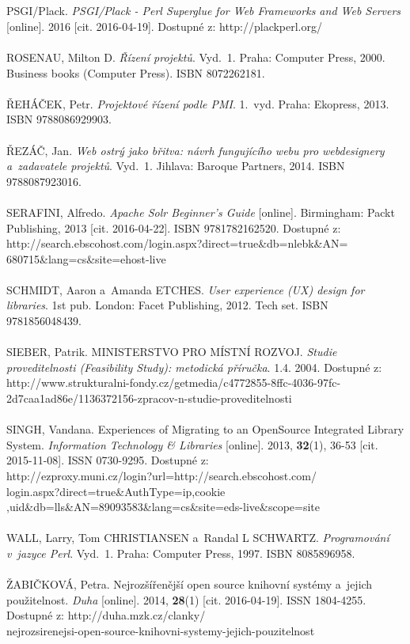 \documentclass[
	11pt, oneside, printed, final, palatino
	microtype,
	table,   %
	lof,     %
	lot     %
]{fithesis3}
\begin{document}
{~\\ ~\\ \noindent
[27] PSGI/Plack. \textit{PSGI/Plack - Perl Superglue for Web Frameworks and Web Servers} [online]. 2016 [cit. 2016-04-19]. Dostupné z: http://plackperl.org/
~\\ ~\\ \noindent
[28] ROSENAU, Milton D. \textit{Řízení projektů}. Vyd.~1. Praha: Computer Press, 2000. Business books (Computer Press). ISBN 8072262181.
~\\ ~\\ \noindent
[29] ŘEHÁČEK, Petr. \textit{Projektové řízení podle PMI}. 1.~vyd. Praha: Ekopress, 2013. ISBN 9788086929903.
~\\ ~\\ \noindent
[30] ŘEZÁČ, Jan. \textit{Web ostrý jako břitva: návrh fungujícího webu pro webdesignery a~zadavatele projektů}. Vyd.~1. Jihlava: Baroque Partners, 2014. ISBN 9788087923016.
~\\ ~\\ \noindent
[31] SERAFINI, Alfredo. \textit{Apache Solr Beginner’s Guide} [online]. Birmingham: Packt Publishing, 2013 [cit. 2016-04-22]. ISBN 9781782162520. Dostupné z: http://search.ebscohost.com/login.aspx?direct=true\&db=nlebk\&AN=\\680715\&lang=cs\&site=ehost-live
~\\ ~\\ \noindent
[32] SCHMIDT, Aaron a~Amanda ETCHES. \textit{User experience (UX) design for libraries}. 1st pub. London: Facet Publishing, 2012. Tech set. ISBN 9781856048439.
~\\ ~\\ \noindent
[33] SIEBER, Patrik. MINISTERSTVO PRO MÍSTNÍ ROZVOJ. \textit{Studie proveditelnosti (Feasibility Study): metodická příručka}. 1.4. 2004. Dostupné z: \\http://www.strukturalni-fondy.cz/getmedia/c4772855-8ffc-4036-97fc-\\2d7caa1ad86e/1136372156-zpracov-n-studie-proveditelnosti
~\\ ~\\ \noindent
[34] SINGH, Vandana. Experiences of Migrating to an OpenSource Integrated Library System. \textit{Information Technology \& Libraries} [online]. 2013, \textbf{32}(1), 36-53 [cit. 2015-11-08]. ISSN 0730-9295. Dostupné z: \\	 http://ezproxy.muni.cz/login?url=http://search.ebscohost.com/\\login.aspx?direct=true\&AuthType=ip,cookie\\,uid\&db=lls\&AN=89093583\&lang=cs\&site=eds-live\&scope=site
~\\ ~\\ \noindent
[35] WALL, Larry, Tom CHRISTIANSEN a~Randal L SCHWARTZ. \textit{Programování v~jazyce Perl}. Vyd.~1. Praha: Computer Press, 1997. ISBN 8085896958.
~\\ ~\\ \noindent
[36] ŽABIČKOVÁ, Petra. Nejrozšířenější open source knihovní systémy a~jejich použitelnost. \textit{Duha} [online]. 2014, 	\textbf{28}(1) [cit. 2016-04-19]. ISSN 1804-4255. Dostupné z: http://duha.mzk.cz/clanky/\\nejrozsirenejsi-open-source-knihovni-systemy-jejich-pouzitelnost

}
\end{document}
